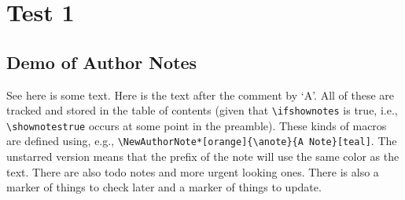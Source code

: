 \documentclass[
11pt,              %
english,           %
doublespacing,     %
liststotoc,        %
headsepline,       %
]{MastersDoctoralThesis} %
\author{Thesis \textsc{Author}}
\newif\ifshownotes
\begin{document}
\frontmatter %

\pagestyle{plain} %







% 




\mainmatter %

\pagestyle{thesis} %




\chapter{Test 1}

\section{Demo of Author Notes}
See here is some text.
Here is the text after the comment by `A'.
All of these are tracked and stored in the table of contents (given that \verb|\ifshownotes| is true, i.e., \verb|\shownotestrue| occurs at some point in the preamble).
These kinds of macros are defined using, e.g., \verb|\NewAuthorNote*[orange]{\anote}{A Note}[teal]|.
The unstarred version means that the prefix of the note will use the same color as the text.
There are also todo notes and more urgent looking ones.
There is also a marker of things to check later and a marker of things to update.
\end{document}
